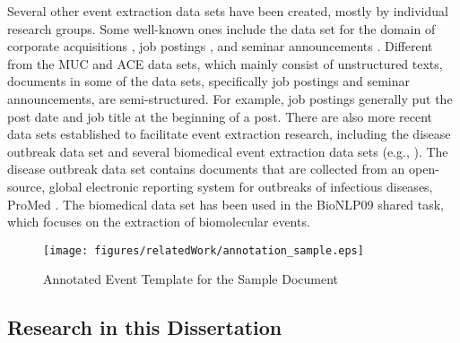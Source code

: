 Several other event extraction data sets have been created,  
mostly by individual research groups. 
Some well-known ones include the data set for the 
domain of corporate acquisitions \cite{freitag-acl98,freitag-aaai00,finn04}, 
job postings \cite{califf03,freitag-aaai00}, and seminar announcements
\cite{freitag-acl98,ciravegna01,chieu02,finn04,gu06}. 
Different from the MUC and ACE data sets, 
which mainly consist of unstructured texts,
documents in some of the data sets, specifically job postings and 
seminar announcements, are semi-structured. 
For example, job postings generally put 
the post date and job title at the beginning of a post. 
There are also more recent data sets established  
to facilitate event extraction research, including 
the disease outbreak data set \cite{patwardhan-emnlp07} 
and several biomedical event extraction data sets (e.g., \cite{McClosky11}). 
The disease outbreak data set contains documents 
that are collected from an open-source, global electronic reporting system for outbreaks 
of infectious diseases, ProMed \cite{promed}. 
The biomedical data set has been used in the BioNLP09 \cite{Kim09} shared task, 
which focuses on the extraction of 
biomolecular events.

\begin{figure}[htbp]
\centering
 \texttt{[image: figures/relatedWork/annotation\_sample.eps]}
 \caption{Annotated Event Template for the Sample Document}
\label{related_annotation_sample}
\end{figure} 

\subsection{Research in this Dissertation}


